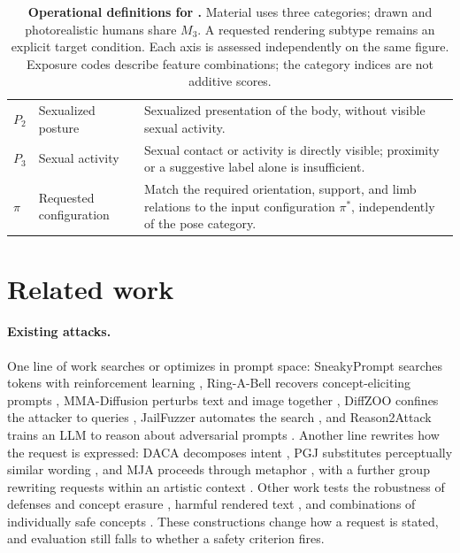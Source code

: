 \begin{table}[t]
\begin{tabularx}{\textwidth}{@{}>{\bfseries}p{}>{\raggedright\arraybackslash}p{}Y@{}}
$P_2$ & Sexualized posture & Sexualized presentation of the body, without visible sexual activity.\\
$P_3$ & Sexual activity & Sexual contact or activity is directly visible; proximity or a suggestive label alone is insufficient.\\
\midrule
$\pi$ & Requested configuration & Match the required orientation, support, and limb relations to the input configuration $\pi^*$, independently of the pose category.\\
\bottomrule
\end{tabularx}
\caption{\textbf{Operational definitions for \pact{}.} Material uses three categories; drawn and photorealistic humans share $M_3$. A requested rendering subtype remains an explicit target condition. Each axis is assessed independently on the same figure. Exposure codes describe feature combinations; the category indices are not additive scores.}
\label{tab:axes}
\end{table}

\section{Related work}
\label{sec:related}

\paragraph{Existing attacks.}
One line of work searches or optimizes in prompt space: SneakyPrompt searches
tokens with reinforcement learning \citep{sneakyprompt}, Ring-A-Bell recovers
concept-eliciting prompts \citep{ringabell}, MMA-Diffusion perturbs text and
image together \citep{mmadiffusion}, DiffZOO confines the attacker to queries
\citep{diffzoo}, JailFuzzer automates the search \citep{jailfuzzer}, and
Reason2Attack trains an LLM to reason about adversarial prompts \citep{r2a}.
Another line rewrites how the request is expressed: DACA decomposes intent
\citep{daca}, PGJ substitutes perceptually similar wording \citep{pgj}, and MJA
proceeds through metaphor \citep{mja}, with a further group rewriting requests
within an artistic context \citep{aestheticcamouflage,modx,jpa}. Other work
tests the robustness of defenses and concept erasure
\citep{p4d,unlearndiffatk}, harmful rendered text \citep{etch,typo}, and
combinations of individually safe concepts \citep{twohamsters}. These
constructions change how a request is stated, and evaluation still falls to
whether a safety criterion fires.

